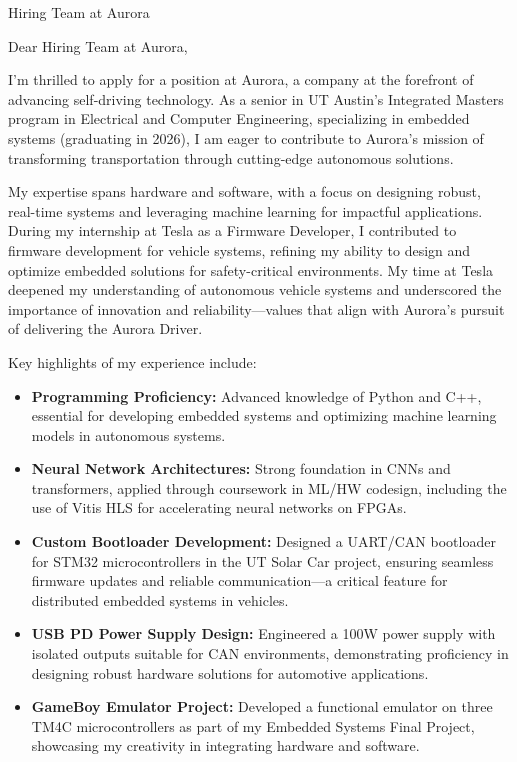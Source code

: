 \documentclass[a4paper,10pt]{letter}
\begin{document}
\begin{letter}{Hiring Team at Aurora}

\opening{Dear Hiring Team at Aurora,}

I'm thrilled to apply for a position at Aurora, a company at the forefront of advancing self-driving technology. As a senior in UT Austin's Integrated Masters program in Electrical and Computer Engineering, specializing in embedded systems (graduating in 2026), I am eager to contribute to Aurora's mission of transforming transportation through cutting-edge autonomous solutions.

My expertise spans hardware and software, with a focus on designing robust, real-time systems and leveraging machine learning for impactful applications. During my internship at Tesla as a Firmware Developer, I contributed to firmware development for vehicle systems, refining my ability to design and optimize embedded solutions for safety-critical environments. My time at Tesla deepened my understanding of autonomous vehicle systems and underscored the importance of innovation and reliability—values that align with Aurora's pursuit of delivering the Aurora Driver.

Key highlights of my experience include:

\begin{itemize}
    \item \textbf{Programming Proficiency:} Advanced knowledge of Python and C++, essential for developing embedded systems and optimizing machine learning models in autonomous systems.
    \item \textbf{Neural Network Architectures:} Strong foundation in CNNs and transformers, applied through coursework in ML/HW codesign, including the use of Vitis HLS for accelerating neural networks on FPGAs.
    \item \textbf{Custom Bootloader Development:} Designed a UART/CAN bootloader for STM32 microcontrollers in the UT Solar Car project, ensuring seamless firmware updates and reliable communication—a critical feature for distributed embedded systems in vehicles.
    \item \textbf{USB PD Power Supply Design:} Engineered a 100W power supply with isolated outputs suitable for CAN environments, demonstrating proficiency in designing robust hardware solutions for automotive applications.
    \item \textbf{GameBoy Emulator Project:} Developed a functional emulator on three TM4C microcontrollers as part of my Embedded Systems Final Project, showcasing my creativity in integrating hardware and software.
\end{itemize}


\end{letter}
\end{document}
